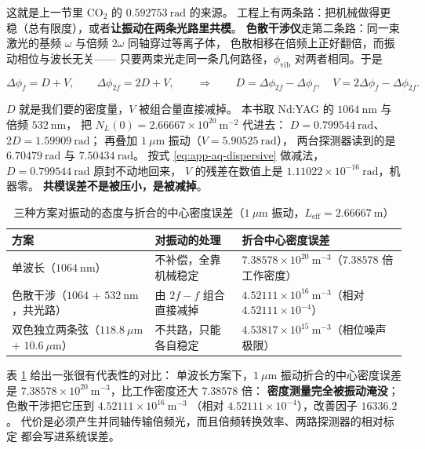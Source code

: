 这就是上一节里 CO$_2$ 的 $0.592753\ \mathrm{rad}$ 的来源。
工程上有两条路：把机械做得更稳（总有限度），或者\textbf{让振动在两条光路里共模}。
\textbf{色散干涉仪}走第二条路：同一束激光的基频 $\omega$ 与倍频 $2\omega$ 同轴穿过等离子体，
色散相移在倍频上正好翻倍，而振动相位与波长无关——
只要两束光走同一条几何路径，$\phi_{\mathrm{vib}}$ 对两者相同。于是

\begin{equation}
\Delta\phi_f = D + V,\qquad
\Delta\phi_{2f} = 2D + V,
\qquad\Longrightarrow\qquad
D = \Delta\phi_{2f} - \Delta\phi_f,\quad
V = 2\Delta\phi_f - \Delta\phi_{2f}.
\label{eq:app-aq-dispersive}
\end{equation}

$D$ 就是我们要的密度量，$V$ 被组合量直接减掉。
本书取 Nd:YAG 的 $1064\ \mathrm{nm}$ 与倍频 $532\ \mathrm{nm}$，
把 $N_L(0) = 2.66667\times10^{20}\ \mathrm{m^{-2}}$ 代进去：
$D = 0.799544\ \mathrm{rad}$、$2D = 1.59909\ \mathrm{rad}$；
再叠加 $1\ \mu\mathrm{m}$ 振动（$V = 5.90525\ \mathrm{rad}$），
两台探测器读到的是 $6.70479\ \mathrm{rad}$ 与 $7.50434\ \mathrm{rad}$。
按式 \eqref{eq:app-aq-dispersive} 做减法，$D = 0.799544\ \mathrm{rad}$ 原封不动地回来，
$V$ 的残差在数值上是 $1.11022\times10^{-16}\ \mathrm{rad}$，机器零。
\textbf{共模误差不是被压小，是被减掉}。

\begin{table}[htbp]
\centering
\small
\caption{三种方案对振动的态度与折合的中心密度误差（$1\ \mu\mathrm{m}$ 振动，$L_{\mathrm{eff}} = 2.66667\ \mathrm{m}$）}
\label{tab:app-aq-dispersion}
\setlength{\tabcolsep}{4pt}
\begin{tabular}{p{4.6cm}p{4.4cm}p{5.0cm}}
\toprule
方案 & 对振动的处理 & 折合中心密度误差 \\
\midrule
单波长（$1064\ \mathrm{nm}$） & 不补偿，全靠机械稳定 & $7.38578\times10^{20}\ \mathrm{m^{-3}}$（$7.38578$ 倍工作密度） \\
色散干涉（$1064$ + $532\ \mathrm{nm}$，共光路） & 由 $2f-f$ 组合直接减掉 & $4.52111\times10^{16}\ \mathrm{m^{-3}}$（相对 $4.52111\times10^{-4}$） \\
双色独立两条弦（$118.8\ \mu\mathrm{m}$ + $10.6\ \mu\mathrm{m}$） & 不共路，只能各自稳定 & $4.53817\times10^{15}\ \mathrm{m^{-3}}$（相位噪声极限） \\
\bottomrule
\end{tabular}
\end{table}

表 \ref{tab:app-aq-dispersion} 给出一张很有代表性的对比：
单波长方案下，$1\ \mu\mathrm{m}$ 振动折合的中心密度误差是
$7.38578\times10^{20}\ \mathrm{m^{-3}}$，比工作密度还大 $7.38578$ 倍：
\textbf{密度测量完全被振动淹没}；色散干涉把它压到 $4.52111\times10^{16}\ \mathrm{m^{-3}}$
（相对 $4.52111\times10^{-4}$），改善因子 $16336.2$。
代价是必须产生并同轴传输倍频光，而且倍频转换效率、两路探测器的相对标定
都会写进系统误差。

